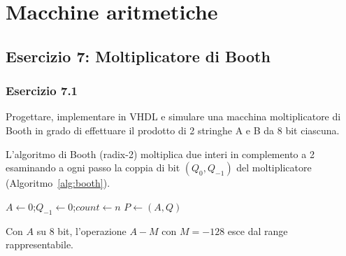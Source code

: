 \chapter{Macchine aritmetiche}

\section{Esercizio 7: Moltiplicatore di Booth}

\subsection{Esercizio 7.1}

\begin{traccia}
	Progettare, implementare in VHDL e simulare una macchina moltiplicatore di Booth in grado
	di effettuare il prodotto di 2 stringhe A e B da 8 bit ciascuna.
\end{traccia}

\progetto

L'algoritmo di Booth (radix-2) moltiplica due interi in complemento a 2 esaminando a ogni
passo la coppia di bit $(Q_0, Q_{-1})$ del moltiplicatore (Algoritmo~\ref{alg:booth}).

\begin{algorithm}[H]
	\caption{Moltiplicazione di Booth radix-2 su $n$ bit.}
	\label{alg:booth}
	$A \leftarrow 0$;\quad $Q_{-1} \leftarrow 0$;\quad $count \leftarrow n$\;
	$P \leftarrow (A, Q)$\;
\end{algorithm}

\begin{attenzione}[Il caso $M = -128$]
	Con $A$ su 8 bit, l'operazione $A - M$ con $M = -128$ esce dal range rappresentabile.
\end{attenzione}

